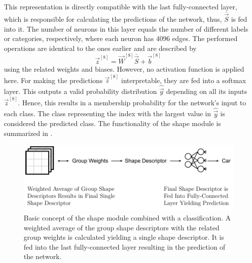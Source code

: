 This representation is directly compatible with the last fully-connected layer, which is responsible for calculating the predictions of the network, thus, $\bar{\vec{S}}$ is fed into it.
The number of neurons in this layer equals the number of different labels or categories, respectively, where each neuron has 4096 edges.
The performed operations are identical to the ones earlier and are described by
\begin{equation}
	\vec{z}^{[8]} = \vec{W}^{[8]} \bar{\vec{S}} + \vec{b}^{[8]}
\end{equation}
using the related weights and biases.
However, no activation function is applied here.
For making the predictions $\vec{z}^{[8]}$ interpretable, they are fed into a softmax layer.
This outputs a valid probability distribution $\hat{\vec{y}}$ depending on all its inputs $\vec{z}^{[8]}$.
Hence, this results in a membership probability for the network's input to each class.
The class representing the index with the largest value in $\hat{\vec{y}}$ is considered the predicted class. The functionality of the shape module is summarized in .
\begin{figure}
	\centering
	\includegraphics[]{images/shape_module_final_shape.pdf}
	\caption[Basic concept of the shape module]{Basic concept of the shape module combined with a classification. A weighted average of the group shape descriptors with the related group weights is calculated yielding a single shape descriptor. It is fed into the last fully-connected layer resulting in the prediction of the network.}
	\label{fig:shape-module-final-shape}
\end{figure}